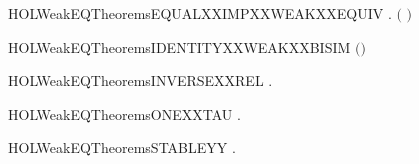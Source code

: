 \newcommand{\HOLWeakEQTheoremsEPSXXWEAKXXEPS}{\UseVerbatim{HOLWeakEQTheoremsEPSXXWEAKXXEPS}}
\begin{SaveVerbatim}{HOLWeakEQTheoremsEQUALXXIMPXXWEAKXXEQUIV}
\HOLTokenTurnstile{} \HOLSymConst{\HOLTokenForall{}} . \ensuremath{(} \HOLSymConst{\ensuremath{=}} \ensuremath{)} \HOLSymConst{\HOLTokenImp{}}   
\end{SaveVerbatim}
\newcommand{\HOLWeakEQTheoremsEQUALXXIMPXXWEAKXXEQUIV}{\UseVerbatim{HOLWeakEQTheoremsEQUALXXIMPXXWEAKXXEQUIV}}
\begin{SaveVerbatim}{HOLWeakEQTheoremsIDENTITYXXWEAKXXBISIM}
\HOLTokenTurnstile{}  \ensuremath{(}\HOLSymConst{\ensuremath{=}}\ensuremath{)}
\end{SaveVerbatim}
\newcommand{\HOLWeakEQTheoremsIDENTITYXXWEAKXXBISIM}{\UseVerbatim{HOLWeakEQTheoremsIDENTITYXXWEAKXXBISIM}}
\begin{SaveVerbatim}{HOLWeakEQTheoremsINVERSEXXREL}
\HOLTokenTurnstile{} \HOLSymConst{\HOLTokenForall{}}  .     \HOLSymConst{\HOLTokenEquiv{}}   
\end{SaveVerbatim}
\newcommand{\HOLWeakEQTheoremsINVERSEXXREL}{\UseVerbatim{HOLWeakEQTheoremsINVERSEXXREL}}
\begin{SaveVerbatim}{HOLWeakEQTheoremsONEXXTAU}
\HOLTokenTurnstile{} \HOLSymConst{\HOLTokenForall{}} .  \HOLTokenTransBegin\HOLConst{\ensuremath{\tau}}\HOLTokenTransEnd {} \HOLSymConst{\HOLTokenImp{}}   
\end{SaveVerbatim}
\newcommand{\HOLWeakEQTheoremsONEXXTAU}{\UseVerbatim{HOLWeakEQTheoremsONEXXTAU}}
\begin{SaveVerbatim}{HOLWeakEQTheoremsSTABLEYY}
\HOLTokenTurnstile{}   \HOLSymConst{\HOLTokenEquiv{}} \HOLSymConst{\HOLTokenForall{}} .  \HOLTokenTransBegin{}\HOLTokenTransEnd {} \HOLSymConst{\HOLTokenImp{}}  \HOLSymConst{\HOLTokenNotEqual{}} \HOLConst{\ensuremath{\tau}}
\end{SaveVerbatim}
\newcommand{\HOLWeakEQTheoremsSTABLEYY}{\UseVerbatim{HOLWeakEQTheoremsSTABLEYY}}
